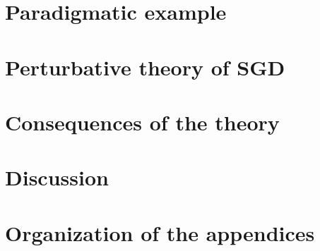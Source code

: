     \section{Paradigmatic example}\label{sect:entropic-example}
        
      
    \section{Perturbative theory of SGD}\label{sect:calculus}
        

    \section{Consequences of the theory}\label{sect:consequences}
        
       
    \section{Discussion}
        

    
    
    
    \appendix

    \newpage
    \section*{Organization of the appendices}
        

